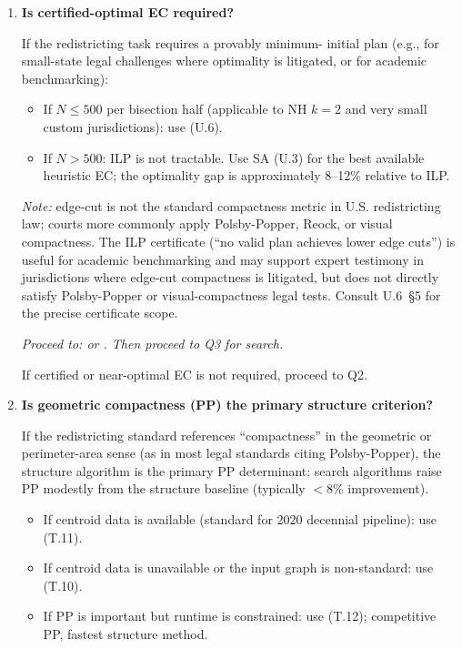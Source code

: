 \begin{enumerate}[label=\textbf{Q\arabic*.}]

  \item \textbf{Is certified-optimal EC required?}

        If the redistricting task requires a provably minimum-\ec{} initial
        plan (e.g., for small-state legal challenges where optimality is
        litigated, or for academic benchmarking):

        \begin{itemize}
          \item If $N \leq 500$ per bisection half (applicable to NH $k = 2$
                and very small custom jurisdictions): use \ilp{} (U.6).
          \item If $N > 500$: ILP is not tractable. Use SA (U.3) for the
                best available heuristic EC; the optimality gap is
                approximately 8--12\% relative to ILP.
        \end{itemize}

        \textit{Note:} edge-cut is not the standard compactness metric in
        U.S. redistricting law; courts more commonly apply Polsby-Popper,
        Reock, or visual compactness.
        The ILP certificate (``no valid plan achieves lower edge cuts'') is
        useful for academic benchmarking and may support expert testimony
        in jurisdictions where edge-cut compactness is litigated, but does
        not directly satisfy Polsby-Popper or visual-compactness legal tests.
        Consult U.6~\S5 for the precise certificate scope.

        \emph{Proceed to: \ilp{} or \sa{}. Then proceed to Q3 for search.}

        If certified or near-optimal EC is not required, proceed to Q2.

  \item \textbf{Is geometric compactness (PP) the primary structure
        criterion?}

        If the redistricting standard references ``compactness'' in the
        geometric or perimeter-area sense (as in most legal standards citing
        Polsby-Popper), the structure algorithm is the primary PP determinant:
        search algorithms raise PP modestly from the structure baseline
        (typically $< 8\%$ improvement).

        \begin{itemize}
          \item If centroid data is available (standard for 2020 decennial
                pipeline): use \cvdgeo{} (T.11).
          \item If centroid data is unavailable or the input graph is
                non-standard: use \cvdg{} (T.10).
          \item If PP is important but runtime is constrained: use
                \bfsgrow{} (T.12); competitive PP, fastest structure method.
        \end{itemize}


\end{enumerate}

